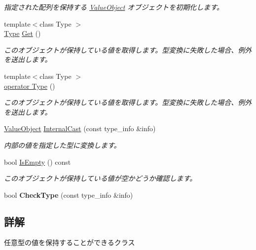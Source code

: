\begin{DoxyCompactItemize}
\begin{DoxyCompactList}\small\item\em 指定された配列を保持する \hyperlink{class_reflection_1_1_value_object}{Value\+Object} オブジェクトを初期化します。\end{DoxyCompactList}\item 
{\footnotesize template$<$class Type $>$ }\\\hyperlink{class_reflection_1_1_type}{Type} \hyperlink{class_reflection_1_1_value_object_a01ab084d58c123074ebbc155e901a23b}{Get} ()
\begin{DoxyCompactList}\small\item\em このオブジェクトが保持している値を取得します。型変換に失敗した場合、例外を送出します。\end{DoxyCompactList}\item 
{\footnotesize template$<$class Type $>$ }\\\hyperlink{class_reflection_1_1_value_object_a65ae4ed69a132b5f156cc83a11129bd6}{operator Type} ()
\begin{DoxyCompactList}\small\item\em このオブジェクトが保持している値を取得します。型変換に失敗した場合、例外を送出します。\end{DoxyCompactList}\item 
\hyperlink{class_reflection_1_1_value_object}{Value\+Object} \hyperlink{class_reflection_1_1_value_object_a21dac9a24e4cd98de42e552a0a65d18c}{Internal\+Cast} (const type\+\_\+info \&info)
\begin{DoxyCompactList}\small\item\em 内部の値を指定した型に変換します。\end{DoxyCompactList}\item 
bool \hyperlink{class_reflection_1_1_value_object_aff9e816bb79890d63f24beb311da7b2c}{Is\+Empty} () const 
\begin{DoxyCompactList}\small\item\em このオブジェクトが保持している値が空かどうか確認します。\end{DoxyCompactList}\item 
bool {\bfseries Check\+Type} (const type\+\_\+info \&info)\hypertarget{class_reflection_1_1_value_object_acf1d193f3708e1e7269fb9d0bd02138a}{}\label{class_reflection_1_1_value_object_acf1d193f3708e1e7269fb9d0bd02138a}

\end{DoxyCompactItemize}


\subsection{詳解}
任意型の値を保持することができるクラス



